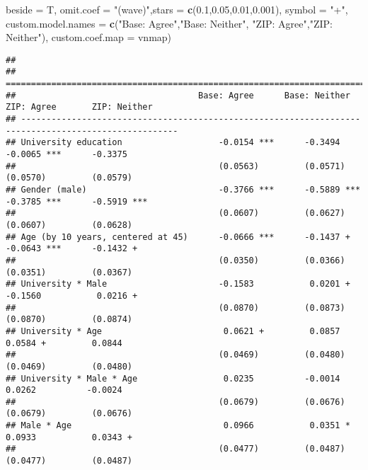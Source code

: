 \documentclass[
]{article}
\newenvironment{Shaded}{\begin{snugshade}}{\end{snugshade}}
\newcommand{\DataTypeTok}[1]{\textcolor[rgb]{0.13,0.29,0.53}{#1}}
\newcommand{\FloatTok}[1]{\textcolor[rgb]{0.00,0.00,0.81}{#1}}
\newcommand{\KeywordTok}[1]{\textcolor[rgb]{0.13,0.29,0.53}{\textbf{#1}}}
\newcommand{\NormalTok}[1]{#1}
\newcommand{\StringTok}[1]{\textcolor[rgb]{0.31,0.60,0.02}{#1}}
\begin{document}
\begin{Shaded}
\begin{Highlighting}[]
          \DataTypeTok{beside =}\NormalTok{ T,}
          \DataTypeTok{omit.coef =} \StringTok{"(wave)"}\NormalTok{,}\DataTypeTok{stars =} \KeywordTok{c}\NormalTok{(}\FloatTok{0.1}\NormalTok{,}\FloatTok{0.05}\NormalTok{,}\FloatTok{0.01}\NormalTok{,}\FloatTok{0.001}\NormalTok{), }\DataTypeTok{symbol =} \StringTok{"+"}\NormalTok{, }
          \DataTypeTok{custom.model.names =} \KeywordTok{c}\NormalTok{(}\StringTok{"Base: Agree"}\NormalTok{,}\StringTok{"Base: Neither"}\NormalTok{,}
                                 \StringTok{"ZIP: Agree"}\NormalTok{,}\StringTok{"ZIP: Neither"}\NormalTok{),}
          \DataTypeTok{custom.coef.map =}\NormalTok{ vnmap)}
\end{Highlighting}
\end{Shaded}

\begin{verbatim}
## 
## =====================================================================================================
##                                    Base: Agree      Base: Neither    ZIP: Agree       ZIP: Neither   
## -----------------------------------------------------------------------------------------------------
## University education                   -0.0154 ***      -0.3494          -0.0065 ***      -0.3375    
##                                        (0.0563)         (0.0571)         (0.0570)         (0.0579)   
## Gender (male)                          -0.3766 ***      -0.5889 ***      -0.3785 ***      -0.5919 ***
##                                        (0.0607)         (0.0627)         (0.0607)         (0.0628)   
## Age (by 10 years, centered at 45)      -0.0666 ***      -0.1437 +        -0.0643 ***      -0.1432 +  
##                                        (0.0350)         (0.0366)         (0.0351)         (0.0367)   
## University * Male                      -0.1583           0.0201 +        -0.1560           0.0216 +  
##                                        (0.0870)         (0.0873)         (0.0870)         (0.0874)   
## University * Age                        0.0621 +         0.0857           0.0584 +         0.0844    
##                                        (0.0469)         (0.0480)         (0.0469)         (0.0480)   
## University * Male * Age                 0.0235          -0.0014           0.0262          -0.0024    
##                                        (0.0679)         (0.0676)         (0.0679)         (0.0676)   
## Male * Age                              0.0966           0.0351 *         0.0933           0.0343 +  
##                                        (0.0477)         (0.0487)         (0.0477)         (0.0487)   

\end{verbatim}
\end{document}
